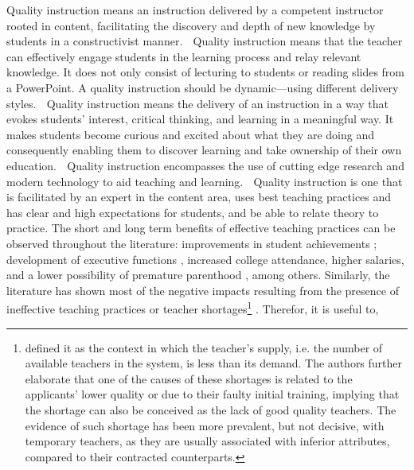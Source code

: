 Quality instruction means an instruction delivered by a competent instructor rooted in
content, facilitating the discovery and depth of new knowledge by students in a constructivist manner.
 Quality instruction means that the teacher can effectively engage students in the learning
process and relay relevant knowledge. It does not only consist of lecturing to students or
reading slides from a PowerPoint. A quality instruction should be dynamic—using different
delivery styles.
 Quality instruction means the delivery of an instruction in a way that evokes students’
interest, critical thinking, and learning in a meaningful way. It makes students become
curious and excited about what they are doing and consequently enabling them to discover
learning and take ownership of their own education.
 Quality instruction encompasses the use of cutting edge research and modern technology to
aid teaching and learning.
 Quality instruction is one that is facilitated by an expert in the content area, uses best
teaching practices and has clear and high expectations for students, and be able to relate
theory to practice.
%
The short and long term benefits of effective teaching practices can be observed throughout the literature: improvements in student achievements \cite{Rockoff_2004, Rivkin_et_al_2005, Duflo_et_al_2009, Hanushek_et_al_2012, Muralidharan_et_al_2013, Chetty_et_al_2014a, Araujo_et_al_2016}; development of executive functions \cite{Araujo_et_al_2016}, increased college attendance, higher salaries, and a lower possibility of premature parenthood \cite{Chetty_et_al_2014b}, among others. Similarly, the literature has shown most of the negative impacts resulting from the presence of ineffective teaching practices \cite{Hanushek_et_al_2012} or teacher shortages\footnote{\citet{Bertoni_et_al_2020a} defined it as the context in which the teacher's supply, i.e. the number of available teachers in the system, is less than its demand. The authors further elaborate that one of the causes of these shortages is related to the applicants' lower quality or due to their faulty initial training, implying that the shortage can also be conceived as the lack of good quality teachers. The evidence of such shortage has been more prevalent, but not decisive, with temporary teachers, as they are usually associated with inferior attributes, compared to their contracted counterparts.} \cite{Duflo_et_al_2009, Muralidharan_et_al_2013, Duflo_et_al_2015, Ayala_2017, Marotta_2019}.
%
Therefor, it is useful to, 
%




